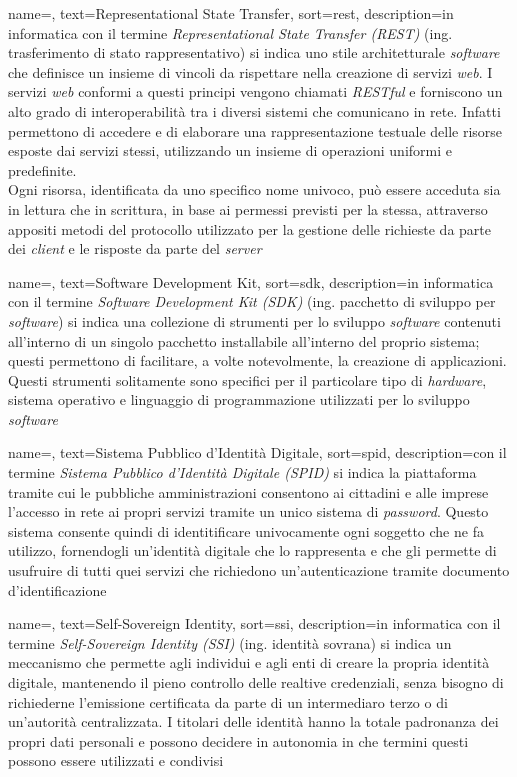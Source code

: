 {
	name=,
	text=Representational State Transfer,
	sort=rest,
	description={in informatica con il termine \emph{Representational State Transfer (REST)} (ing. trasferimento di stato rappresentativo) si indica uno stile architetturale \textit{software} che definisce un insieme di vincoli da rispettare nella creazione di servizi \textit{web}. I servizi \textit{web} conformi a questi principi vengono chiamati \textit{RESTful} e forniscono un alto grado di interoperabilità tra i diversi sistemi che comunicano in rete. Infatti permettono di accedere e di elaborare una rappresentazione testuale delle risorse esposte dai servizi stessi, utilizzando un insieme di operazioni uniformi e predefinite.\\
	Ogni risorsa, identificata da uno specifico nome univoco, può essere acceduta sia in lettura che in scrittura, in base ai permessi previsti per la stessa, attraverso appositi metodi del protocollo utilizzato per la gestione delle richieste da parte dei \textit{client} e le risposte da parte del \textit{server}}
}

{
	name=,
	text=Software Development Kit,
	sort=sdk,
	description={in informatica con il termine \emph{Software Development Kit (SDK)} (ing. pacchetto di sviluppo per \textit{software}) si indica una collezione di strumenti per lo sviluppo \textit{software} contenuti all'interno di un singolo pacchetto installabile all'interno del proprio sistema; questi permettono di facilitare, a volte notevolmente, la creazione di applicazioni. Questi strumenti solitamente sono specifici per il particolare tipo di \textit{hardware}, sistema operativo e linguaggio di programmazione utilizzati per lo sviluppo \textit{software}}
}

{
	name=,
	text=Sistema Pubblico d'Identità Digitale,
	sort=spid,
	description={con il termine \emph{Sistema Pubblico d'Identità Digitale (SPID)} si indica la piattaforma tramite cui le pubbliche amministrazioni consentono ai cittadini e alle imprese l'accesso in rete ai propri servizi tramite un unico sistema di \textit{password}. Questo sistema consente quindi di identitificare univocamente ogni soggetto che ne fa utilizzo, fornendogli un'identità digitale che lo rappresenta e che gli permette di usufruire di tutti quei servizi che richiedono un'autenticazione tramite documento d'identificazione}
}

{
	name=,
	text=Self-Sovereign Identity,
	sort=ssi,
	description={in informatica con il termine \emph{Self-Sovereign Identity (SSI)} (ing. identità sovrana) si indica un meccanismo che permette agli individui e agli enti di creare la propria identità digitale, mantenendo il pieno controllo delle realtive credenziali, senza bisogno di richiederne l'emissione certificata da parte di un intermediaro terzo o di un'autorità centralizzata. I titolari delle identità hanno la totale padronanza dei propri dati personali e possono decidere in autonomia in che termini questi possono essere utilizzati e condivisi}
}

